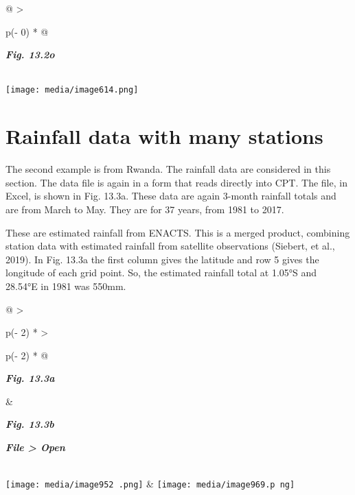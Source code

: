 \documentclass[
  letterpaper,
  DIV=11,
  numbers=noendperiod]{scrreprt}
\begin{document}
\begin{longtable}[]{@{}
  >{\raggedright\arraybackslash}p{(\columnwidth - 0\tabcolsep) * }@{}}
\toprule\noalign{}
\begin{minipage}[b]{\linewidth}\raggedright
\textbf{\emph{Fig. 13.2o}}
\end{minipage} \\
\midrule\noalign{}
\endhead
\bottomrule\noalign{}
\endlastfoot
\texttt{[image: media/image614.png]} \\
\end{longtable}

\section{Rainfall data with many
stations}\label{rainfall-data-with-many-stations}

The second example is from Rwanda. The rainfall data are considered in
this section. The data file is again in a form that reads directly into
CPT. The file, in Excel, is shown in Fig. 13.3a. These data are again
3-month rainfall totals and are from March to May. They are for 37
years, from 1981 to 2017.

These are estimated rainfall from ENACTS. This is a merged product,
combining station data with estimated rainfall from satellite
observations (Siebert, et al., 2019). In Fig. 13.3a the first column
gives the latitude and row 5 gives the longitude of each grid point. So,
the estimated rainfall total at 1.05°S and 28.54°E in 1981 was 550mm.

\begin{longtable}[]{@{}
  >{\raggedright\arraybackslash}p{(\columnwidth - 2\tabcolsep) * }
  >{\raggedright\arraybackslash}p{(\columnwidth - 2\tabcolsep) * }@{}}
\toprule\noalign{}
\begin{minipage}[b]{\linewidth}\raggedright
\textbf{\emph{Fig. 13.3a}}
\end{minipage} & \begin{minipage}[b]{\linewidth}\raggedright
\textbf{\emph{Fig. 13.3b}}

\textbf{\emph{File \textgreater{} Open}}
\end{minipage} \\
\midrule\noalign{}
\endhead
\bottomrule\noalign{}
\endlastfoot
\texttt{[image: media/image952 .png]}
&
\texttt{[image: media/image969.p ng]} \\
\end{longtable}
\end{document}
